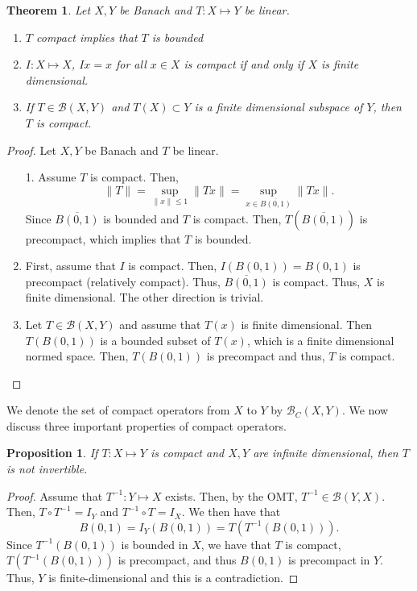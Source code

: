 \documentclass[12pt]{article}
\newtheorem{theorem}{Theorem}
\newtheorem{proposition}{Proposition}
\newcommand{\B}{\mathscr{B}}
\newcommand{\sbs}{\subset}
\begin{document}
\begin{theorem}
Let $X, Y$ be Banach and $T: X \mapsto Y$ be linear. 
\begin{enumerate}[topsep=-15pt, itemsep=0pt]
\item $T$ compact implies that $T$ is bounded
\item $I: X \mapsto X$, $Ix = x$ for all $x \in X$ is compact if and only if $X$ is finite dimensional. 
\item If $T \in \B(X, Y)$ and $T(X) \sbs Y$ is a finite dimensional subspace of $Y$, then $T$ is compact. 
\end{enumerate}
\end{theorem}
\vspace{-25pt}
\begin{proof}
Let $X, Y$ be Banach and $T$ be linear.
\begin{enumerate}[topsep=-15pt, itemsep=0pt]
\item[1.] Assume $T$ is compact. Then, 
\[ \| T \| = \sup\limits_{\| x \| \leq 1} \| Tx \| = \sup\limits_{x \in \overline{B(0, 1)}} \| Tx \|.\]
Since $\overline{B(0,1)}$ is bounded and $T$ is compact. Then, $T(\overline{B(0,1)})$ is precompact, which implies that $T$ is bounded.
\item First, assume that $I$ is compact. Then, $I(B(0,1)) = B(0, 1)$ is precompact (relatively compact). Thus, $\overline{B(0,1)}$ is compact. Thus, $X$ is finite dimensional. The other direction is trivial.
\item Let $T \in \B(X, Y)$ and assume that $T(x)$ is finite dimensional. Then $T(B(0, 1))$ is a bounded subset of $T(x)$, which is a finite dimensional normed space. Then, $T(B(0,1))$ is precompact and thus, $T$ is compact. 
\end{enumerate}
\end{proof}
\vspace{-25pt}
We denote the set of compact operators from $X$ to $Y$ by $\B_C(X, Y)$. We now discuss three important properties of compact operators. 
\setcounter{proposition}{0}
\begin{proposition}
If $T: X \mapsto Y$ is compact and $X, Y$ are infinite dimensional, then $T$ is not invertible.
\end{proposition}
\vspace{-25pt}
\begin{proof}
Assume that $T^{-1}: Y \mapsto X$ exists. Then, by the OMT, $T^{-1} \in \B(Y, X)$. Then, $T \circ T^{-1} = I_Y$ and $T^{-1} \circ T = I_X$. We then have that 
\[ B(0,1) = I_Y(B(0,1)) = T(T^{-1}(B(0,1))).\]
Since $T^{-1}(B(0,1))$ is bounded in $X$, we have that $T$ is compact, $T(T^{-1}(B(0,1)))$ is precompact, and thus $B(0, 1)$ is precompact in $Y$. Thus, $Y$ is finite-dimensional and this is a contradiction.
\end{proof}
\end{document}

